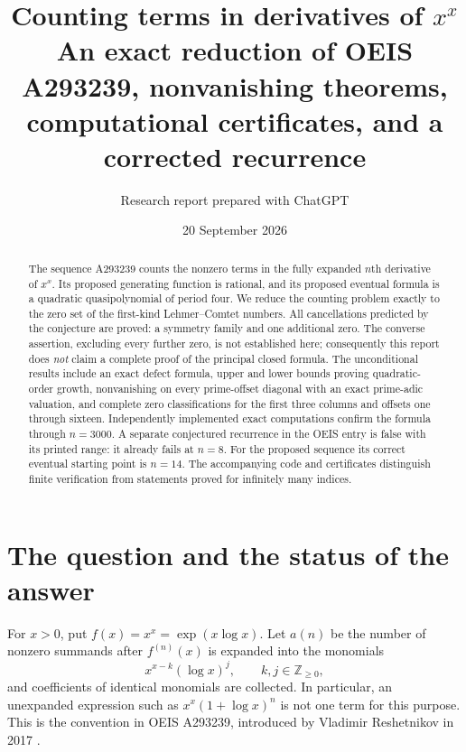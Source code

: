 \documentclass[11pt,a4paper]{article}
\title{\textbf{Counting terms in derivatives of $x^x$}\\[5pt]
\large An exact reduction of OEIS A293239, nonvanishing theorems,\\
computational certificates, and a corrected recurrence}
\author{Research report prepared with ChatGPT}
\date{20 September 2026}
\numberwithin{equation}{section}
\theoremstyle{definition}
\theoremstyle{remark}
\newcommand{\Z}{\mathbb Z}
\begin{document}
\maketitle
\begin{abstract}
The sequence A293239 counts the nonzero terms in the fully expanded $n$th
 derivative of $x^x$. Its proposed generating function is rational, and its
 proposed eventual formula is a quadratic quasipolynomial of period four.
 We reduce the counting problem exactly to the zero set of the first-kind
 Lehmer--Comtet numbers. All cancellations predicted by the conjecture are
 proved: a symmetry family and one additional zero. The converse assertion,
 excluding every further zero, is not established here; consequently this
 report does \emph{not} claim a complete proof of the principal closed formula.
 The unconditional results include an exact defect formula, upper and lower
 bounds proving quadratic-order growth, nonvanishing on every prime-offset
 diagonal with an exact prime-adic valuation, and complete zero classifications
 for the first three columns and offsets one through sixteen. Independently
 implemented exact computations confirm the formula through $n=3000$.
 A separate conjectured recurrence in the OEIS entry is false with its printed
 range: it already fails at $n=8$. For the proposed sequence its correct
 eventual starting point is $n=14$. The accompanying code and certificates
 distinguish finite verification from statements proved for infinitely many
 indices.
\end{abstract}
\clearpage
\tableofcontents
\newpage

\section{The question and the status of the answer}

For $x>0$, put $f(x)=x^x=\exp(x\log x)$. Let $a(n)$ be the number of nonzero
summands after $f^{(n)}(x)$ is expanded into the monomials
\begin{equation}\label{eq:monomials}
 x^{x-k}(\log x)^j,\qquad k,j\in\Z_{\ge0},
\end{equation}
and coefficients of identical monomials are collected. In particular, an
unexpanded expression such as $x^x(1+\log x)^n$ is not one term for this
purpose. This is the convention in OEIS A293239, introduced by Vladimir
Reshetnikov in 2017 \cite{oeis293239}.
\end{document}
